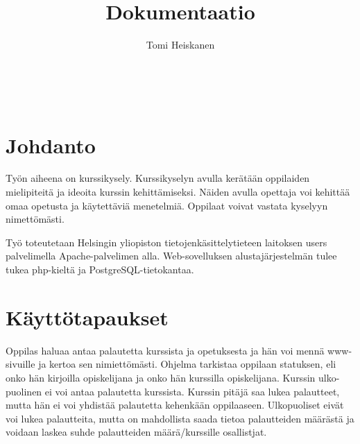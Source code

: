 \documentclass[12pt,twoside,a4paper,leqno,titlepage]{article}
\title{Dokumentaatio}
\author{Tomi Heiskanen}
\begin{document}
\maketitle

\
\thispagestyle{empty}
\newpage

\setcounter{page}{1}
\tableofcontents
\thispagestyle{empty}

\newpage
\section{Johdanto}

Työn aiheena on kurssikysely. Kurssikyselyn avulla kerätään oppilaiden
mielipiteitä ja ideoita kurssin kehittämiseksi. Näiden avulla opettaja voi
kehittää omaa opetusta ja käytettäviä menetelmiä. Oppilaat voivat vastata
kyselyyn nimettömästi.

Työ toteutetaan Helsingin yliopiston tietojenkäsittelytieteen laitoksen users
palvelimella Apache-palvelimen alla. Web-sovelluksen alustajärjestelmän tulee
tukea php-kieltä ja PostgreSQL-tietokantaa.

\section{Käyttötapaukset}

Oppilas haluaa antaa palautetta kurssista ja opetuksesta ja hän voi mennä www-
sivuille ja kertoa sen nimiettömästi. Ohjelma tarkistaa oppilaan statuksen, eli
onko hän kirjoilla opiskelijana ja onko hän kurssilla opiskelijana. Kurssin ulko-
puolinen ei voi antaa palautetta kurssista. Kurssin pitäjä saa lukea palautteet,
mutta hän ei voi yhdistää palautetta kehenkään oppilaaseen. Ulkopuoliset eivät
voi lukea palautteita, mutta on mahdollista saada tietoa palautteiden määrästä
ja voidaan laskea suhde palautteiden määrä/kurssille osallistjat.
\end{document}
